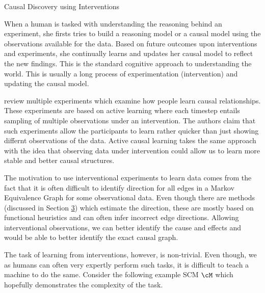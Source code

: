 \documentclass[10pt]{article}
\begin{document}
\begin{psection}[4]{Causal Discovery using Interventions}

    When a human is tasked with understanding the reasoning behind an experiment, she
    firsts tries to build a reasoning model or a causal model using the observations
    available for the data. Based on future outcomes upon interventions and experiments,
    she continually learns and updates her causal model to reflect the new findings.
    This is the standard cognitive approach to understanding the world. This is usually
    a long process of experimentation (intervention) and updating the causal model.

    \citet{rottman2012} review multiple experiments which examine how people learn
    causal relationships. These experiments are based on active learning where each
    timestep entails sampling of multiple observations under an intervention. The
    authors claim that such experiments allow the participants to learn rather quicker
    than just showing differnt observations of the data. Active causal learning takes
    the same approach with the idea that observing data under intervention could allow
    us to learn more stable and better causal structures.

    The motivation to use interventional experiments to learn data comes from the fact
    that it is often difficult to identify direction for all edges in a Markov
    Equivalence Graph for some observational data. Even though there are methods
    (discussed in Section \hyperlink{sec:3}{3}) which estimate the direction, these are
    mostly based on functional heuristics and can often infer incorrect edge directions.
    Allowing interventional observations, we can better identify the cause and effects
    and would be able to better identify the exact causal graph.

    The task of learning from interventions, however, is non-trivial. Even though, we
    as humans can often very expertly perform such tasks, it is difficult to teach a
    machine to do the same. Consider the following example SCM $\cM$ which hopefully
    demonstrates the complexity of the task.


\end{psection}
\end{document}
